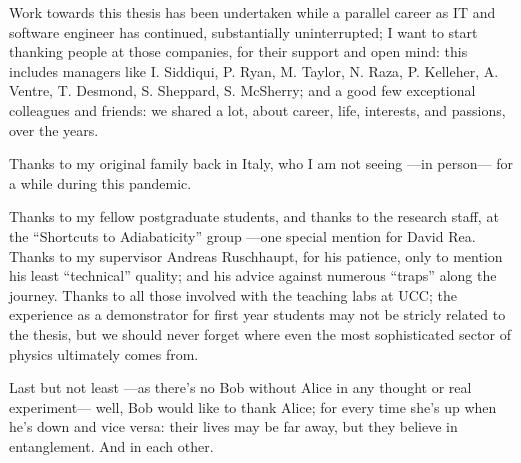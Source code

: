 {
\small
Work towards this thesis has been undertaken while a parallel career
as IT and software engineer has continued,
substantially uninterrupted;
I want to start thanking people at those companies, for their support and open mind:
this includes managers like I. Siddiqui, P. Ryan, M. Taylor, N. Raza, P. Kelleher, A. Ventre, T. Desmond, S. Sheppard, S. McSherry;
and a good few exceptional colleagues and friends: we shared a lot, about career, life, interests, and passions, over the years.

Thanks to my original family back in Italy,
who I am not seeing ---in person--- for a while during this pandemic.

Thanks to my fellow postgraduate students,
and thanks to the research staff,
at the ``Shortcuts to Adiabaticity'' group
---one special mention for David Rea.
%
Thanks to my supervisor Andreas Ruschhaupt, for his patience,
only to mention his least ``technical'' quality;
and his advice against numerous ``traps'' along the journey.
%
Thanks to all those involved with the teaching labs at UCC;
the  experience as a demonstrator for first year students may not be stricly related to the thesis,
but we should never forget where even the most sophisticated sector of physics
ultimately comes from.

Last but not least ---as there's no Bob without Alice in any thought or real ex\-per\-i\-ment---
well, Bob would like to thank Alice;
for every time she’s up when he’s down and vice versa:
their lives may be far away, but they believe in entanglement. And in each other.
}